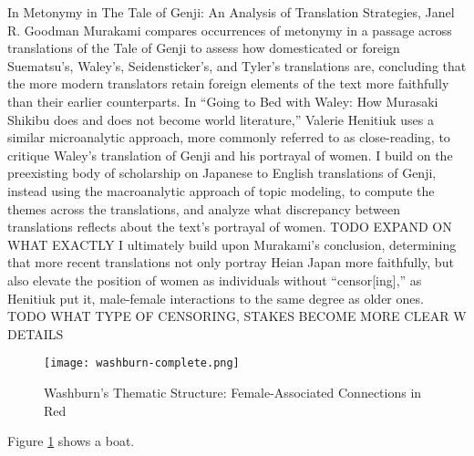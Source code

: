\documentclass[12pt]{article}
\begin{document}
\begin{flushleft}
\begin{spacing}{2.0}
\setlength{\parindent}{0.5in} 

In Metonymy in The Tale of Genji: An Analysis of Translation Strategies, Janel R. Goodman Murakami compares occurrences of metonymy in a passage across translations of the Tale of Genji to assess how domesticated or foreign Suematsu’s, Waley’s, Seidensticker’s, and Tyler’s translations are, concluding that the more modern translators retain foreign elements of the text more faithfully than their earlier counterparts. In ``Going to Bed with Waley: How Murasaki Shikibu does and does not become world literature,'' Valerie Henitiuk uses a similar microanalytic approach, more commonly referred to as close-reading, to critique Waley’s translation of Genji and his portrayal of women. I build on the preexisting body of scholarship on Japanese to English translations of Genji, instead using the macroanalytic approach of topic modeling, to compute the themes across the translations, and analyze what discrepancy between translations reflects about the text’s portrayal of women. TODO EXPAND ON WHAT EXACTLY I ultimately build upon Murakami’s conclusion, determining that more recent translations not only portray Heian Japan more faithfully, but also elevate the position of women as individuals without ``censor[ing],'' as Henitiuk put it, male-female interactions to the same degree as older ones. TODO WHAT TYPE OF CENSORING, STAKES BECOME MORE CLEAR W DETAILS

\begin{figure}
  \texttt{[image: washburn-complete.png]}
  \caption{Washburn's Thematic Structure: Female-Associated Connections in Red}
  \label{fig:washburn-full}
\end{figure}

Figure \ref{fig:washburn-full} shows a boat.


\end{spacing}
\end{flushleft}
\end{document}
